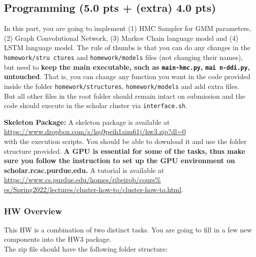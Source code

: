 \documentclass{article}
\newcommand{\homeworknumber}{3\xspace}
\begin{document}


%
\newpage

%
\subsection*{Programming (5.0 pts + (extra) 4.0 pts)}
%
In this part, you are going to implement (1) HMC Sampler for GMM parameters,
(2) Graph Convolutional Network, (3) Markov Chain language model and (4) LSTM
language model.
%
The rule of thumbs is that you can do any changes in the \texttt{homework/stru%
ctures} and \texttt{homework/models} files (not changing their names), but need
to \textbf{keep the main executable, such as \texttt{main-hmc.py}, \texttt{mai%
n-ddi.py}, untouched}.
%
That is, you can change any function you want in the code provided inside the
folder \texttt{homework/structures}, \texttt{homework/models} and add extra
files.
%
But all other files in the root folder should remain intact on submission and
the code should execute in the scholar cluster via \texttt{interface.sh}.

%
\hfill

%
\noindent \textbf{Skeleton Package:}
%
A skeleton package is available at \\
\url{https://www.dropbox.com/s/lsq9peih1aim61j/hw3.zip?dl=0}\\
 with the execution scripts.
%
You should be able to download it and use the folder structure provided.
%
\textbf{A GPU is essential for some of the tasks, thus make sure you follow the
instruction to set up the GPU environment on scholar.rcac.purdue.edu.}
%
A tutorial is available at \url{https://www.cs.purdue.edu/homes/ribeirob/cours%
es/Spring2022/lectures/cluster-how-to/cluster-how-to.html}.

%
\subsubsection*{HW Overview}
%
This HW is a combination of two distinct tasks.
%
You are going to fill in a few new components into the HW\homeworknumber package.
\\
%
\noindent The zip file should have the following folder structure:
\end{document}
